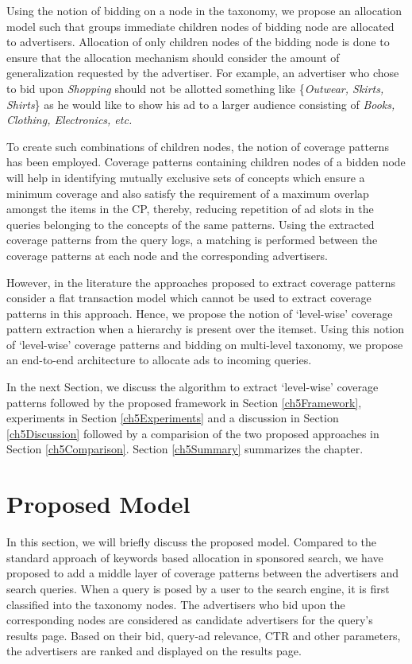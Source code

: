 Using the notion of bidding on a node in the taxonomy, we propose an allocation model such that groups immediate children nodes of bidding node are allocated to advertisers. Allocation of only children nodes of the bidding node is done to ensure that the allocation mechanism should consider the amount of generalization requested by the advertiser. For example, an advertiser who chose to bid upon \textit{Shopping} should not be allotted something like \{\textit{Outwear, Skirts, Shirts}\} as he would like to show his ad to a larger audience consisting of \textit{Books, Clothing, Electronics, etc.} 

To create such combinations of children nodes, the notion of coverage patterns has been employed. Coverage patterns containing children nodes of a bidden node will help in identifying mutually exclusive sets of concepts which ensure a minimum coverage and also satisfy the requirement of a maximum overlap amongst the items in the CP, thereby, reducing repetition of ad slots in the queries belonging to the concepts of the same patterns. Using the extracted coverage patterns from the query logs, a matching is performed between the coverage patterns at each node and the corresponding advertisers. 

However, in the literature the approaches proposed to extract coverage patterns \cite{srinivas2014mining} consider a flat transaction model which cannot be used to extract coverage patterns in this approach. Hence, we propose the notion of `level-wise' coverage pattern extraction when a hierarchy is present over the itemset. Using this notion of `level-wise' coverage patterns and bidding on multi-level taxonomy, we propose an end-to-end architecture to allocate ads to incoming queries. 

In the next Section, we discuss the algorithm to extract `level-wise' coverage patterns followed by the proposed framework in Section \ref{ch5Framework}, experiments in Section \ref{ch5Experiments} and a discussion in Section \ref{ch5Discussion} followed by a comparision of the two proposed approaches in Section \ref{ch5Comparison}. Section \ref{ch5Summary} summarizes the chapter.

\section{Proposed Model}
In this section, we will briefly discuss the proposed model. Compared to the standard approach of keywords based allocation in sponsored search, we have proposed to add a middle layer of coverage patterns between the advertisers and search queries. When a query is posed by a user to the search engine, it is first classified into the taxonomy nodes. The advertisers who bid upon the corresponding nodes are considered as candidate advertisers for the query's results page. Based on their bid, query-ad relevance, CTR and other parameters, the advertisers are ranked and displayed on the results page.




